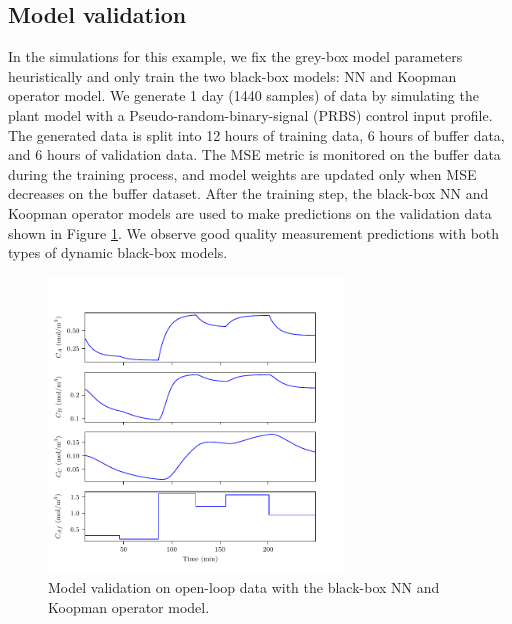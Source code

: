 \documentclass[10pt]{article}
\begin{document}
\subsection{Model validation}
In the simulations for this example, we fix the grey-box model parameters
heuristically and only train the two black-box models: NN and Koopman operator
model. We generate 1 day (1440 samples) of data by simulating the plant model
with a Pseudo-random-binary-signal (PRBS) control input profile. The generated
data is split into 12 hours of training data, 6 hours of buffer data, and 6
hours of validation data. The MSE metric is monitored on the buffer data during
the training process, and model weights are updated only when MSE decreases on
the buffer dataset. After the training step, the black-box NN and Koopman
operator models are used to make predictions on the validation data shown in
Figure \ref{fig:tworeac_validation}. We observe good quality measurement
predictions with both types of dynamic black-box models.

\begin{figure}[!h]
  \centering
  \includegraphics[page=1, height=0.5\textheight,
                   width=0.7\textwidth]{tworeac_plots.pdf}
  \caption{Model validation on open-loop data with the black-box NN and Koopman operator model.}
  \label{fig:tworeac_validation}
\end{figure}
\end{document}
